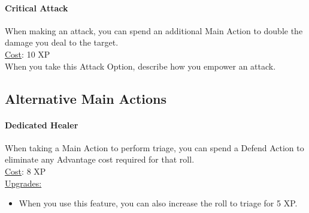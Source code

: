 \paragraph{Critical Attack}
When making an attack, you can spend an additional Main Action to double the damage you deal to the target.
\\
\underline{Cost}: 10 XP
\\
When you take this Attack Option, describe how you empower an attack.

\subsection{Alternative Main Actions}
\paragraph{Dedicated Healer}
When taking a Main Action to perform triage, you can spend a Defend Action to eliminate any Advantage cost required for that roll.
\\
\underline{Cost}: 8 XP
\\
\underline{Upgrades:}
\begin{itemize}
  \item[-] When you use this feature, you can also increase the roll to triage for 5 XP.
\end{itemize}

